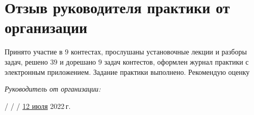 \section{Отзыв руководителя практики от организации}

Принято участие в $9$ контестах, прослушаны установочные лекции и разборы задач, решено $39$ и дорешано $9$ задач контестов, оформлен журнал практики с электронным приложением. Задание практики выполнено. Рекомендую оценку

\vspace{10pt}

\textit{Руководитель от организации:}

 /  /  / \underline{12 июля} 2022\,г.

\pagebreak
